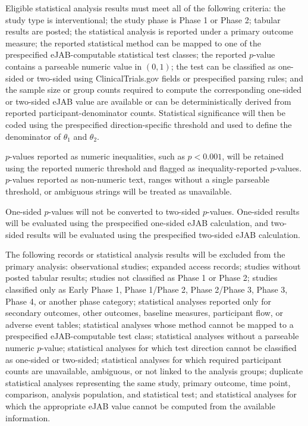 \documentclass[11pt]{article}
\begin{document}
Eligible statistical analysis results must meet all of the following criteria: the study type is interventional; the study phase is Phase 1 or Phase 2; tabular results are posted; the statistical analysis is reported under a primary outcome measure; the reported statistical method can be mapped to one of the prespecified eJAB-computable statistical test classes; the reported \(p\)-value contains a parseable numeric value in \((0,1)\); the test can be classified as one-sided or two-sided using ClinicalTrials.gov fields or prespecified parsing rules; and the sample size or group counts required to compute the corresponding one-sided or two-sided eJAB value are available or can be deterministically derived from reported participant-denominator counts. Statistical significance will then be coded using the prespecified direction-specific threshold and used to define the denominator of \(\theta_1\) and \(\theta_2\).

\(p\)-values reported as numeric inequalities, such as \(p < 0.001\), will be retained using the reported numeric threshold and flagged as inequality-reported \(p\)-values. \(p\)-values reported as non-numeric text, ranges without a single parseable threshold, or ambiguous strings will be treated as unavailable.

One-sided \(p\)-values will not be converted to two-sided \(p\)-values. One-sided results will be evaluated using the prespecified one-sided eJAB calculation, and two-sided results will be evaluated using the prespecified two-sided eJAB calculation.

The following records or statistical analysis results will be excluded from the primary analysis: observational studies; expanded access records; studies without posted tabular results; studies not classified as Phase 1 or Phase 2; studies classified only as Early Phase 1, Phase 1/Phase 2, Phase 2/Phase 3, Phase 3, Phase 4, or another phase category; statistical analyses reported only for secondary outcomes, other outcomes, baseline measures, participant flow, or adverse event tables; statistical analyses whose method cannot be mapped to a prespecified eJAB-computable test class; statistical analyses without a parseable numeric \(p\)-value; statistical analyses for which test direction cannot be classified as one-sided or two-sided; statistical analyses for which required participant counts are unavailable, ambiguous, or not linked to the analysis groups; duplicate statistical analyses representing the same study, primary outcome, time point, comparison, analysis population, and statistical test; and statistical analyses for which the appropriate eJAB value cannot be computed from the available information.
\end{document}
